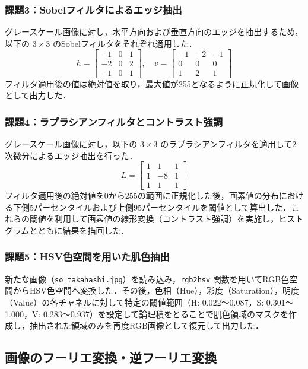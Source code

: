\documentclass[paper=a4, fontsize=10pt]{jlreq}
\begin{document}
\subsubsection{課題3：Sobelフィルタによるエッジ抽出}
グレースケール画像に対し，水平方向および垂直方向のエッジを抽出するため，以下の $3 \times 3$ のSobelフィルタをそれぞれ適用した．
$$ h = \begin{bmatrix} -1 & 0 & 1 \\ -2 & 0 & 2 \\ -1 & 0 & 1 \end{bmatrix}, \quad v = \begin{bmatrix} -1 & -2 & -1 \\ 0 & 0 & 0 \\ 1 & 2 & 1 \end{bmatrix} $$
フィルタ適用後の値は絶対値を取り，最大値が255となるように正規化して画像として出力した．

\subsubsection{課題4：ラプラシアンフィルタとコントラスト強調}
グレースケール画像に対し，以下の $3 \times 3$ のラプラシアンフィルタを適用して2次微分によるエッジ抽出を行った．
$$ L = \begin{bmatrix} 1 & 1 & 1 \\ 1 & -8 & 1 \\ 1 & 1 & 1 \end{bmatrix} $$
フィルタ適用後の絶対値を0から255の範囲に正規化した後，画素値の分布における下側5パーセンタイルおよび上側95パーセンタイルを閾値として算出した．これらの閾値を利用して画素値の線形変換（コントラスト強調）を実施し，ヒストグラムとともに結果を描画した．

\subsubsection{課題5：HSV色空間を用いた肌色抽出}
新たな画像（\texttt{so\_takahashi.jpg}）を読み込み，\texttt{rgb2hsv} 関数を用いてRGB色空間からHSV色空間へ変換した．その後，色相（Hue），彩度（Saturation），明度（Value）の各チャネルに対して特定の閾値範囲（H: 0.022〜0.087，S: 0.301〜1.000，V: 0.283〜0.937）を設定して論理積をとることで肌色領域のマスクを作成し，抽出された領域のみを再度RGB画像として復元して出力した．

\subsection{画像のフーリエ変換・逆フーリエ変換}
\end{document}
